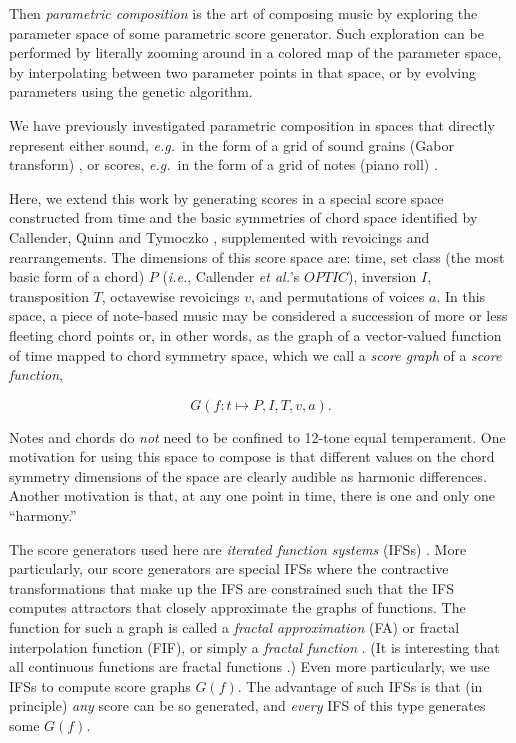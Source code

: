 \documentclass[english,11pt,letterpaper,onecolumn]{scrartcl}
\numberwithin{equation}{section}
\newcommand{\be}{\begin{equation}}
\newcommand{\ee}{\end{equation}}
\begin{document}
Then \textit{parametric composition} is the art of composing music by exploring
the parameter space of some parametric score generator. Such exploration can be
performed by literally zooming around in a colored map of the parameter space,
by interpolating between two parameter points in that space, or by evolving
parameters using the genetic algorithm.

We have previously investigated parametric composition in spaces that directly
represent either sound, \textit{e.g.}\ in the form of a grid of sound grains
(Gabor transform) \cite{obsessed}, or scores, \textit{e.g.}\ in the form of a
grid of notes (piano roll) \cite{ifsmusic}.

Here, we extend this work by generating scores in a special score space
constructed from time and the basic symmetries of chord space identified by
Callender, Quinn and Tymoczko \cite{callender:346}, supplemented with revoicings
and rearrangements. The dimensions of this score space are: time, set class (the
most basic form of a  chord) $P$ (\textit{i.e.}, Callender \textit{et al.}'s
$OPTIC$), inversion $I$, transposition $T$, octavewise revoicings $v$, and
permutations of voices $a$. In this space, a piece of note-based music may be
considered a succession of more or less fleeting chord points or, in other
words, as the graph of a vector-valued function of time mapped to chord symmetry
space, which we call a \textit{score graph} of a \textit{score function},


\be \label{score_graph}
G(f: t \mapsto P, I, T, v, a).
\ee


\noindent Notes and chords do \textit{not} need to be confined to 12-tone equal
temperament. One motivation for using this space to compose is that different
values on the chord symmetry dimensions of the space are clearly audible as
harmonic differences. Another motivation is that, at any one point in time,
there is one and only one ``harmony.''

The score generators used here are \textit{iterated function systems} (IFSs)
\cite{barnsley1985iterated, 10.2307/24893080, fractalseverywhere}. More
particularly, our score generators are special IFSs where the contractive
transformations that make up the IFS are constrained such that the IFS computes
attractors that closely approximate the graphs of functions. The function for
such a graph is called a \textit{fractal approximation} (FA) or fractal
interpolation function (FIF), or simply a \textit{fractal function}
\cite{Barnsley1986, fractalseverywhere, navascues2014fractal}. (It is
interesting that all continuous functions are fractal functions
\cite{2016arXiv161001369B}.) Even more particularly, we use IFSs to compute
score graphs $G(f)$. The advantage of such IFSs is that (in principle) \textit{any}
score can be so generated, and \textit{every} IFS of this type generates some
$G(f)$.
\end{document}
